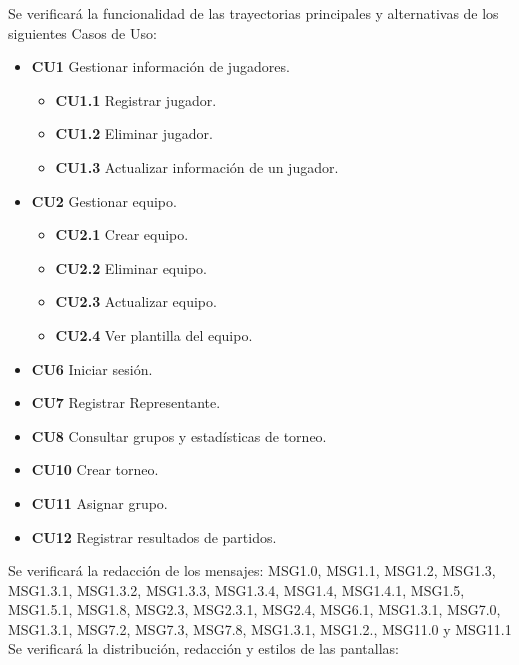 \documentclass[oneside,10pt]{book}
\begin{document}
	Se verificará la funcionalidad de las trayectorias principales y alternativas de los siguientes Casos de Uso:
\begin{itemize}
\item \textbf{CU1} Gestionar información de jugadores.
	\begin{itemize}
	\item \textbf{CU1.1} Registrar jugador.
	\item \textbf{CU1.2} Eliminar jugador.
	\item \textbf{CU1.3} Actualizar información de un jugador.
	\end{itemize}
\item \textbf{CU2} Gestionar equipo.
	\begin{itemize}
	\item \textbf{CU2.1} Crear equipo.
	\item \textbf{CU2.2} Eliminar equipo.
	\item \textbf{CU2.3} Actualizar equipo.
	\item \textbf{CU2.4} Ver plantilla del equipo.
	\end{itemize}
\item \textbf{CU6} Iniciar sesión.
\item \textbf{CU7} Registrar Representante.
\item \textbf{CU8} Consultar grupos y estadísticas de torneo.
\item \textbf{CU10} Crear torneo.
\item \textbf{CU11} Asignar grupo.
\item \textbf{CU12} Registrar resultados de partidos.
\end{itemize}

	Se verificará la redacción de los mensajes: MSG1.0, MSG1.1, MSG1.2, MSG1.3, MSG1.3.1, MSG1.3.2, MSG1.3.3, MSG1.3.4, MSG1.4, MSG1.4.1, MSG1.5, MSG1.5.1, MSG1.8, MSG2.3, MSG2.3.1, MSG2.4, MSG6.1, MSG1.3.1, MSG7.0, MSG1.3.1, MSG7.2, MSG7.3, MSG7.8, MSG1.3.1, MSG1.2., MSG11.0 y MSG11.1\\
	
	Se verificará la distribución, redacción y estilos de las pantallas:
\end{document}
